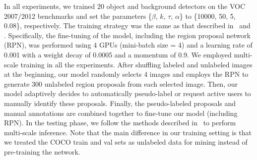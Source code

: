 \documentclass[journal]{IEEEtran}
\begin{document}
{In all experiments, we trained $20$ object and background detectors on the VOC 2007/2012 benchmarks and set the parameters \{$\beta$, $k$, $\tau$, $\alpha$\} to \{10000, 50, 5, 0.08\}, respectively. The training strategy was the same as that described in~\cite{frcn} and \cite{rfcn16NIPS}. Specifically, the fine-tuning of the model, including the region proposal network (RPN), was performed using 4 GPUs (mini-batch size = 4) and a learning rate of 0.001 with a weight decay of 0.0005 and a momentum of 0.9. We employed multi-scale training in all the experiments. After shuffling labeled and unlabeled images at the beginning, our model randomly selects 4 images and {employs the RPN} to generate 300 unlabeled region proposals from each selected image. Then, our model adaptively decides to automatically pseudo-label or request active users to manually identify these proposals. Finally, the pseudo-labeled proposals and manual annotations are combined together to fine-tune our model (including RPN). In the testing phase, we follow the methods described in~\cite{spp15PAMI, rfcn16NIPS} to perform multi-scale inference. Note that the main difference in our training setting is that we treated the COCO train and val sets as unlabeled data for mining instead of pre-training the network. 

}
\end{document}
